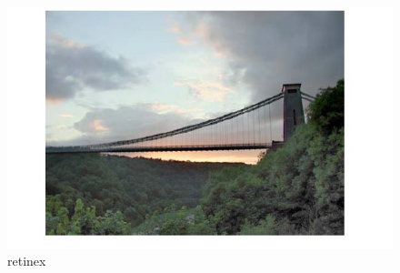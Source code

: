       \begin{figure}[!htb]
      	\includegraphics[width=\linewidth]{images/retinex1}
      	\caption{retinex}\label{fig:logtonemap}
      	\endminipage\hfill
      \end{figure}

  
